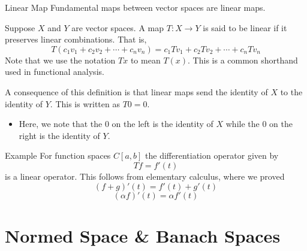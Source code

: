 \documentclass[10pt]{beamer}
\begin{document}
		\begin{frame}{Linear Map}
				Fundamental maps between vector spaces are linear maps. 
				\begin{definition}
						Suppose $X$ and $Y$ are vector spaces. A map $T: X\to Y$ is said to be \alert{linear} if it preserves linear combinations. That is, 
						\begin{equation*}
								T(c_1v_1 + c_2v_2 + \cdots + c_nv_n) = c_1Tv_1 + c_2Tv_2 + \cdots + c_nTv_n
						\end{equation*}
						Note that we use the notation $Tx$ to mean $T(x)$. This is a common shorthand used in functional analysis.
				\end{definition}
				A consequence of this definition is that linear maps send the identity of $X$ to the identity of $Y$. This is written as $T0 = 0$. 
				\begin{itemize}
						\item Here, we note that the $0$ on the left is the identity of $X$ while the $0$ on the right is the identity of $Y$. 
				\end{itemize}
		\end{frame}

		\begin{frame}{Example}
				For function spaces $C[a,b]$ the differentiation operator given by 
				\begin{equation*}
						Tf = f'(t)
				\end{equation*}
				is a linear operator. This follows from elementary calculus, where we proved 
				\begin{equation*}
						(f+g)'(t) = f'(t) + g'(t) 
				\end{equation*}
				\begin{equation*}
						(\alpha f)'(t) = \alpha f'(t)
				\end{equation*}
		\end{frame}

		\section{Normed Space \& Banach Spaces}
\end{document}
